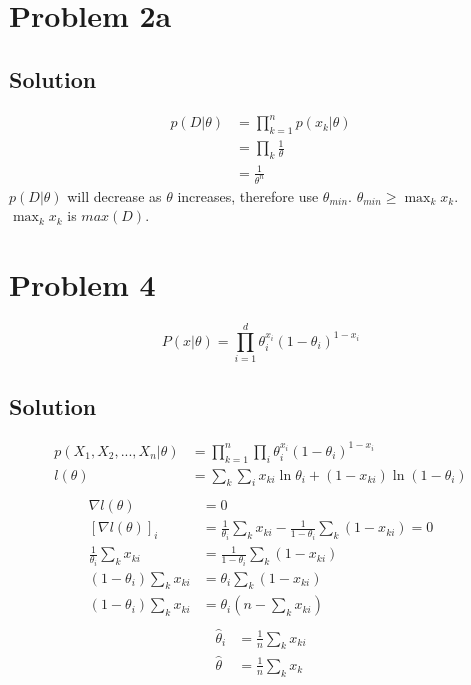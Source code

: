 \documentclass{IEEEtran}
\begin{document}
\newpage

\section{Problem 2a}
\subsection{Solution}
\begin{align*}
    p(D|\theta) &= \prod_{k=1}^{n}p(x_k|\theta) \\
    &= \prod_k \frac{1}{\theta} \\
    &= \frac{1}{\theta^n}
\end{align*}
\(p(D|\theta)\) will decrease as \(\theta\) increases, therefore use \(\theta_{min}\). \(\theta_{min} \ge \max_k x_k\). \(\max_k x_k\) is \(max\left(D\right)\).

\newpage

\section{Problem 4}
\[P(x|\theta) = \prod_{i=1}^d \theta_i^{x_i} \left(1 - \theta_i\right)^{1 - x_i}\]
\subsection{Solution}
\begin{align*}
    p(X_1, X_2, ..., X_n|\theta) &= \prod_{k=1}^n \prod_i \theta_i^{x_i} \left(1 - \theta_i\right)^{1 - x_i} \\
    l(\theta) &= \sum_k \sum_i x_{ki} \ln \theta_i + \left(1 - x_{ki}\right) \ln\left(1 - \theta_i\right) \\
\end{align*}
\begin{align*}
    \nabla l(\theta) &= 0 \\
    \left[\nabla l(\theta)\right]_i &= \frac{1}{\theta_i} \sum_k x_{ki} - \frac{1}{1 - \theta_i} \sum_k \left(1 - x_{ki}\right) = 0 \\
    \frac{1}{\theta_i} \sum_k x_{ki} &= \frac{1}{1 - \theta_i} \sum_k \left(1 - x_{ki}\right) \\
    \left(1 - \theta_i\right) \sum_k x_{ki} &= \theta_i \sum_k \left(1 - x_{ki}\right) \\
    \left(1 - \theta_i\right) \sum_k x_{ki} &= \theta_i \left(n - \sum_k x_{ki}\right) \\
\end{align*}
\begin{align*}
    \hat{\theta}_i &= \frac{1}{n}\sum_k x_{ki} \\
    \hat{\theta} &=  \frac{1}{n}\sum_k x_{k}
\end{align*}
\end{document}
